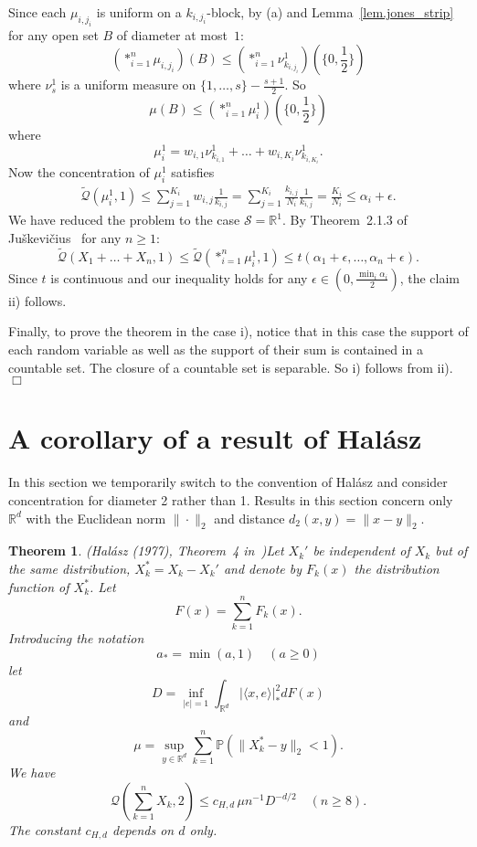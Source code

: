 \documentclass{article}
\newenvironment{proofof}[1]{\noindent {\bf Proof of #1}}{\hspace*{\fill}$\Box$}
\newtheorem{theorem}{Theorem}[section]
\newcommand{\pr}{\mathbb P}
\newcommand{\conc}{\mathcal{Q}}
\newcommand{\concdiam}{\tilde{\mathcal{Q}}}
\begin{document}
\begin{proofof}{Theorem~\ref{close_to_line}}
    Since each $\mu_{i, j_i}$ is uniform on
a $k_{i,j_i}$-block, 
    by (a) and Lemma~\ref{lem.jones_strip} for any open set $B$ of diameter at most~$1$:
    \[
        (*_{i=1}^n \mu_{i, j_i})(B) \le (*_{i=1}^n \nu^1_{k_{i,j_i}}) (\{0,\frac 1 2\})
    \]
    where $\nu^1_s$ is a uniform measure on $\{1, \dots, s\} - \frac {s+1} 2$. So
    \[
        \mu(B) \le  (*_{i=1}^n \mu_i^1) (\{0, \frac 1 2\})
    \]
    where
    \[
        \mu_i^1 = w_{i,1} \nu^1_{k_{i,1}} + \dots + w_{i,K_i} \nu^1_{k_{i,K_i}}.
    \]
    Now the concentration of $\mu_i^1$ satisfies
    \begin{align*}
        \concdiam(\mu_i^1, 1) \le \sum_{j=1}^{K_i} w_{i,j} \frac 1 {k_{i,j}}
        = \sum_{j=1}^{K_i} \frac {k_{i,j}} {N_i} \frac 1 {k_{i,j}} = \frac {K_i} {N_i} \le \alpha_i+\epsilon.
    \end{align*}
    We have reduced the problem to the 
case $\mathcal{S} = \mathbb{R}^1$.
    By Theorem~2.1.3 of Juškevičius~\cite{tj} for any $n \ge 1$:
    \[
        \concdiam(X_1 + \dots + X_n, 1) \le \concdiam(*_{i=1}^n \mu_i^1, 1) \le t(\alpha_1+\epsilon, \dots, \alpha_n+\epsilon).
    \]
Since $t$ is continuous and our inequality holds for any $\epsilon \in (0, \frac {\min_i \alpha_i} 2)$, the claim ii) follows.

    Finally, to prove the theorem in the case i), notice that in this case
    the support of each random variable as well as the support of their sum is
    contained in a countable set.
    The closure of a countable set is separable. So i) follows from ii).
\end{proofof}



\section{A corollary of a result of Hal{\'a}sz}
\label{sec.halasz}

In this section we temporarily switch to the convention of Hal{\'a}sz \cite{halasz} and consider concentration for diameter 2 rather than 1.
Results in this section concern only $\mathbb{R}^d$ with the Euclidean norm $\|\cdot\|_2$ and distance $d_2(x,y) = \| x-y\|_2$.

\begin{theorem}{(Hal{\'a}sz (1977), Theorem~4 in~\cite{halasz})}\label{thm.halasz}
    Let $X_k'$ be independent of $X_k$ but of the same distribution, $X_k^* = X_k - X_k'$ and denote by $F_k(x)$ the distribution function of $X^*_k$. Let 
    \[
        F(x) = \sum_{k=1}^n F_k(x).
    \]
    Introducing the notation
    \[
        a_* = \min(a,1) \quad (a \ge 0)
    \]
    let
    \[
        D=\inf_{|e|=1} \int_{\mathbb{R}^d} |\langle x, e \rangle|_*^2 dF(x)
    \]
    and 
    \[
        \mu = \sup_{y \in \mathbb{R}^d} \sum_{k=1}^n \pr (\|X^*_k - y\|_2<1).
    \]
    We have 
    \[
        \conc(\sum_{k=1}^n X_k, 2) \le c_{H,d}\, \mu n^{-1} D^{-d/2} \quad (n \ge 8).
    \]
    The constant $c_{H,d}$ depends on $d$ only.
\end{theorem}
\end{document}
